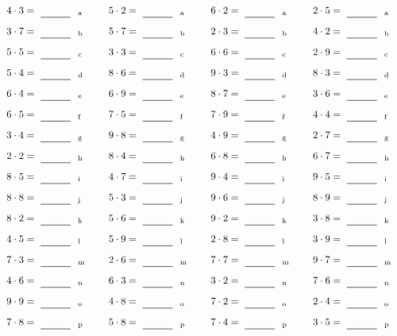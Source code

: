 \documentclass
[
  draft    = true,
  fontsize = 11pt,
  parskip  = half-
]
{scrartcl}
\begin{document}
\par\vfill\par
\begin{align*}
    \pline{4\cdot3}&=\rline{a}
  & \pline{5\cdot2}&=\rline{a}
  & \pline{6\cdot2}&=\rline{a}
  & \pline{2\cdot5}&=\rline{a} \\[1ex]
    \pline{3\cdot7}&=\rline{b}
  & \pline{5\cdot7}&=\rline{b}
  & \pline{2\cdot3}&=\rline{b}
  & \pline{4\cdot2}&=\rline{b} \\[1ex]
    \pline{5\cdot5}&=\rline{c}
  & \pline{3\cdot3}&=\rline{c}
  & \pline{6\cdot6}&=\rline{c}
  & \pline{2\cdot9}&=\rline{c} \\[1ex]
    \pline{5\cdot4}&=\rline{d}
  & \pline{8\cdot6}&=\rline{d}
  & \pline{9\cdot3}&=\rline{d}
  & \pline{8\cdot3}&=\rline{d} \\[1ex]
    \pline{6\cdot4}&=\rline{e}
  & \pline{6\cdot9}&=\rline{e}
  & \pline{8\cdot7}&=\rline{e}
  & \pline{3\cdot6}&=\rline{e} \\[1ex]
    \pline{6\cdot5}&=\rline{f}
  & \pline{7\cdot5}&=\rline{f}
  & \pline{7\cdot9}&=\rline{f}
  & \pline{4\cdot4}&=\rline{f} \\[1ex]
    \pline{3\cdot4}&=\rline{g}
  & \pline{9\cdot8}&=\rline{g}
  & \pline{4\cdot9}&=\rline{g}
  & \pline{2\cdot7}&=\rline{g} \\[1ex]
    \pline{2\cdot2}&=\rline{h}
  & \pline{8\cdot4}&=\rline{h}
  & \pline{6\cdot8}&=\rline{h}
  & \pline{6\cdot7}&=\rline{h} \\[1ex]
    \pline{8\cdot5}&=\rline{i}
  & \pline{4\cdot7}&=\rline{i}
  & \pline{9\cdot4}&=\rline{i}
  & \pline{9\cdot5}&=\rline{i} \\[1ex]
    \pline{8\cdot8}&=\rline{j}
  & \pline{5\cdot3}&=\rline{j}
  & \pline{9\cdot6}&=\rline{j}
  & \pline{8\cdot9}&=\rline{j} \\[1ex]
    \pline{8\cdot2}&=\rline{k}
  & \pline{5\cdot6}&=\rline{k}
  & \pline{9\cdot2}&=\rline{k}
  & \pline{3\cdot8}&=\rline{k} \\[1ex]
    \pline{4\cdot5}&=\rline{l}
  & \pline{5\cdot9}&=\rline{l}
  & \pline{2\cdot8}&=\rline{l}
  & \pline{3\cdot9}&=\rline{l} \\[1ex]
    \pline{7\cdot3}&=\rline{m}
  & \pline{2\cdot6}&=\rline{m}
  & \pline{7\cdot7}&=\rline{m}
  & \pline{9\cdot7}&=\rline{m} \\[1ex]
    \pline{4\cdot6}&=\rline{n}
  & \pline{6\cdot3}&=\rline{n}
  & \pline{3\cdot2}&=\rline{n}
  & \pline{7\cdot6}&=\rline{n} \\[1ex]
    \pline{9\cdot9}&=\rline{o}
  & \pline{4\cdot8}&=\rline{o}
  & \pline{7\cdot2}&=\rline{o}
  & \pline{2\cdot4}&=\rline{o} \\[1ex]
    \pline{7\cdot8}&=\rline{p}
  & \pline{5\cdot8}&=\rline{p}
  & \pline{7\cdot4}&=\rline{p}
  & \pline{3\cdot5}&=\rline{p}
\end{align*}
\end{document}
